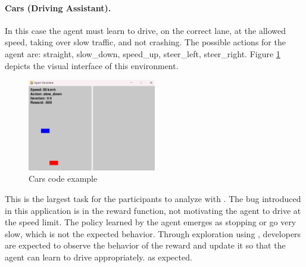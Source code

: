 \paragraph{\textbf{Cars (Driving Assistant).}} In this case the agent must learn to drive, on the correct lane, at the allowed speed, taking over slow traffic, and not crashing. The possible actions for the agent are: straight, slow\_down, speed\_up, steer\_left, steer\_right. Figure \ref{fig:cars-code-example} depicts the visual interface of this environment.

\begin{figure}[h]
    \centering
    \includegraphics[width=0.5\textwidth]{figures/cars_example.png}
    \caption{Cars code example}
    \label{fig:cars-code-example}
\end{figure}

This is the largest task for the participants to analyze with \flik. %
The bug introduced in this application is in the reward function, not motivating the agent to drive at the speed limit. The policy learned by the agent emerges as stopping or go very slow, which is not the expected behavior. Through exploration using \flik, developers are expected to observe the behavior of the reward and update it so that the agent can learn to drive appropriately.
as expected.


